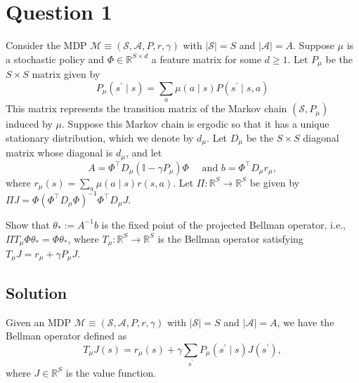 \section*{Question 1}

Consider the MDP \( \mathcal{M} \equiv(\mathcal{S}, \mathcal{A}, P, r, \gamma) \) with \( \vert \mathcal{S} \vert = S \) and \( \vert \mathcal{A} \vert = A \).
Suppose \( \mu \) is a stochastic policy and \( \Phi \in \mathbb{R}^{S \times d} \) a feature matrix for some \( d \geq 1 \).
Let \( P_{\mu} \) be the \( S \times S \) matrix given by
\[
    P_{\mu}\left(s^{\prime} \mid s\right)=\sum_{a} \mu(a \mid s) P\left(s^{\prime} \mid s, a\right)
\]
This matrix represents the transition matrix of the Markov chain \( \left(\mathcal{S}, P_{\mu}\right) \) induced by \( \mu \).
Suppose this Markov chain is ergodic so that it has a unique stationary distribution, which we denote by \( d_{\mu} \).
Let \( D_{\mu} \) be the \( S \times S \) diagonal matrix whose diagonal is \( d_{\mu} \), and let
\[
    A=\Phi^{\top} D_{\mu}\left(\mathbb{I}-\gamma P_{\mu}\right) \Phi \quad \text { and } b=\Phi^{\top} D_{\mu} r_{\mu},
\]
where \( r_{\mu}(s)=\sum_{a} \mu(a \mid s) r(s, a) \).
Let \( \Pi: \mathbb{R}^{S} \rightarrow \mathbb{R}^{S} \) be given by \( \Pi J=\Phi{\left(\Phi^{\top} D_{\mu} \Phi\right)}^{-1} \Phi^{\top} D_{\mu} J \).

Show that \( \theta_\ast:=A^{-1} b \) is the fixed point of the projected Bellman operator, i.e., \( \Pi T_{\mu} \Phi \theta_\ast=\Phi \theta_\ast \), where \( T_{\mu}: \mathbb{R}^{S} \rightarrow \mathbb{R}^{S} \) is the Bellman operator satisfying \( T_{\mu} J=r_{\mu}+\gamma P_{\mu} J \).

\subsection*{Solution}

Given an MDP \( \mathcal{M} \equiv(\mathcal{S}, \mathcal{A}, P, r, \gamma) \) with \( \vert \mathcal{S} \vert = S \) and \( \vert \mathcal{A} \vert = A \), we have the Bellman operator defined as
\[
    T_{\mu} J(s) = r_{\mu}(s) + \gamma \sum_{s^{\prime}} P_{\mu}(s^{\prime} \mid s) J(s^{\prime}),
\]
where \( J \in \mathbb{R}^{S} \) is the value function.

